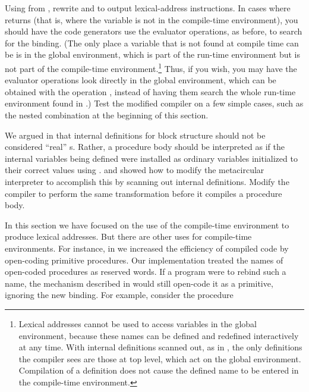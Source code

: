 \begin{exerciseGroup}
\label{Exercise 5.42}
 Using  from
, rewrite  and
 to output lexical-address instructions.  In cases
where  returns  (that is, where the
variable is not in the compile-time environment), you should have the code
generators use the evaluator operations, as before, to search for the binding.
(The only place a variable that is not found at compile time can be is in the
global environment, which is part of the run-time environment but is not part
of the compile-time environment.\footnote{Lexical addresses cannot be used to
access variables in the global environment, because these names can be defined
and redefined interactively at any time.  With internal definitions scanned
out, as in , the only definitions the compiler sees are
those at top level, which act on the global environment.  Compilation of a
definition does not cause the defined name to be entered in the compile-time
environment.}  Thus, if you wish, you may have the evaluator operations look
directly in the global environment, which can be obtained with the operation
, instead of having them search the whole
run-time environment found in .)  Test the modified compiler on a few
simple cases, such as the nested  combination at the beginning of
this section.

\label{Exercise 5.43}
 We argued in 
that internal definitions for block structure should not be considered ``real''
s.  Rather, a procedure body should be interpreted as if the
internal variables being defined were installed as ordinary 
variables initialized to their correct values using .
 and  showed how to modify the metacircular
interpreter to accomplish this by scanning out internal definitions.  Modify
the compiler to perform the same transformation before it compiles a procedure
body.

\label{Exercise 5.44}
 In this section we have focused
on the use of the compile-time environment to produce lexical addresses.  But
there are other uses for compile-time environments.  For instance, in
 we increased the efficiency of compiled code by open-coding
primitive procedures.  Our implementation treated the names of open-coded
procedures as reserved words.  If a program were to rebind such a name, the
mechanism described in  would still open-code it as a
primitive, ignoring the new binding.  For example, consider the procedure


\end{exerciseGroup}
